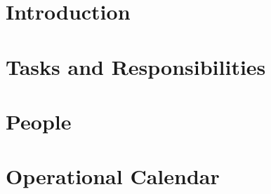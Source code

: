 


\chapter{Introduction}\label{intro}


\chapter{Tasks and Responsibilities}\label{tasks}


\chapter{People}\label{people}


\chapter{Operational Calendar}\label{opcal}
















